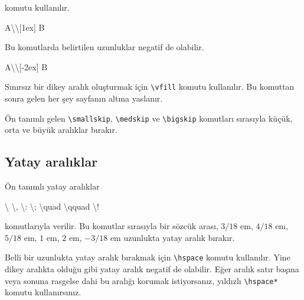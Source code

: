 \documentclass[
  10pt,
]{scrbook}
\newenvironment{Shaded}{}{}
\newcommand{\FunctionTok}[1]{\textcolor[rgb]{0.02,0.16,0.49}{#1}}
\newcommand{\NormalTok}[1]{#1}
\theoremstyle{definition}
\theoremstyle{definition}
\theoremstyle{definition}
\theoremstyle{definition}
\theoremstyle{remark}
\begin{document}
komutu kullanılır.

\begin{Shaded}
\begin{Highlighting}[]
\NormalTok{A}\FunctionTok{\textbackslash{}\textbackslash{}}\NormalTok{[1ex]}
\NormalTok{B}
\end{Highlighting}
\end{Shaded}

Bu komutlarda belirtilen uzunluklar negatif de olabilir.

\begin{Shaded}
\begin{Highlighting}[]
\NormalTok{A}\FunctionTok{\textbackslash{}\textbackslash{}}\NormalTok{[{-}2ex]}
\NormalTok{B}
\end{Highlighting}
\end{Shaded}

Sınırsız bir dikey aralık oluşturmak için \texttt{\textbackslash{}vfill} komutu kullanılır. Bu komuttan sonra gelen her şey sayfanın altına yaslanır.

Ön tanımlı gelen \texttt{\textbackslash{}smallskip}, \texttt{\textbackslash{}medskip} ve \texttt{\textbackslash{}bigskip} komutları sırasıyla küçük, orta ve büyük aralıklar bırakır.

\hypertarget{yatay-aralux131klar}{%
\subsection{Yatay aralıklar}\label{yatay-aralux131klar}}

Ön tanımlı yatay aralıklar

\begin{Shaded}
\begin{Highlighting}[]
\FunctionTok{\textbackslash{} } \FunctionTok{\textbackslash{},}  \FunctionTok{\textbackslash{}:}  \FunctionTok{\textbackslash{};}  \FunctionTok{\textbackslash{}quad}  \FunctionTok{\textbackslash{}qquad}  \FunctionTok{\textbackslash{}!}
\end{Highlighting}
\end{Shaded}

komutlarıyla verilir. Bu komutlar sırasıyla bir sözcük arası, \(3/\!18\) em, \(4/\!18\) em, \(5/\!18\) em, \(1\) em, \(2\) em, \(-3/\!18\) em uzunlukta yatay aralık bırakır.

Belli bir uzunlukta yatay aralık bırakmak için \texttt{\textbackslash{}hspace} komutu kullanılır. Yine dikey aralıkta olduğu gibi yatay aralık negatif de olabilir. Eğer aralık satır başına veya sonuna rasgelse dahi bu aralığı korumak istiyorsanız, yıldızlı \texttt{\textbackslash{}hspace*} komutu kullanırsınız.
\end{document}
